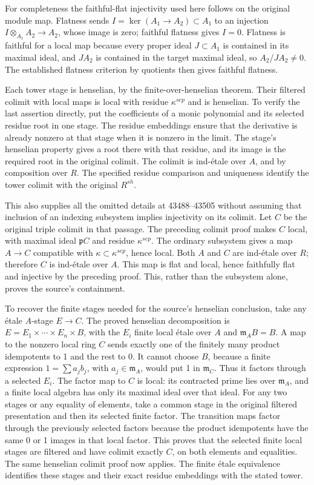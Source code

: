 For completeness the faithful-flat injectivity used here follows on the original module map. Flatness sends \(I=\ker(A_1\to A_2)\subset A_1\) to an injection \(I\otimes_{A_1}A_2\to A_2\), whose image is zero; faithful flatness gives \(I=0\). Flatness is faithful for a local map because every proper ideal \(J\subset A_1\) is contained in its maximal ideal, and \(JA_2\) is contained in the target maximal ideal, so \(A_2/JA_2\ne0\). The established flatness criterion by quotients then gives faithful flatness.

Each tower stage is henselian, by the finite-over-henselian theorem. Their filtered colimit with local maps is local with residue \(\kappa^{sep}\) and is henselian. To verify the last assertion directly, put the coefficients of a monic polynomial and its selected residue root in one stage. The residue embeddings ensure that the derivative is already nonzero at that stage when it is nonzero in the limit. The stage's henselian property gives a root there with that residue, and its image is the required root in the original colimit. The colimit is ind-étale over \(A\), and by composition over \(R\). The specified residue comparison and uniqueness identify the tower colimit with the original \(R^{sh}\).

This also supplies all the omitted details at 43488--43505 without assuming that inclusion of an indexing subsystem implies injectivity on its colimit. Let \(C\) be the original triple colimit in that passage. The preceding colimit proof makes \(C\) local, with maximal ideal \(\mathfrak pC\) and residue \(\kappa^{sep}\). The ordinary subsystem gives a map \(A\to C\) compatible with \(\kappa\subset\kappa^{sep}\), hence local. Both \(A\) and \(C\) are ind-étale over \(R\); therefore \(C\) is ind-étale over \(A\). This map is flat and local, hence faithfully flat and injective by the preceding proof. This, rather than the subsystem alone, proves the source's containment.

To recover the finite stages needed for the source's henselian conclusion, take any étale \(A\)-stage \(E\to C\). The proved henselian decomposition is \(E=E_1\times\cdots\times E_n\times B\), with the \(E_i\) finite local étale over \(A\) and \(\mathfrak m_A B=B\). A map to the nonzero local ring \(C\) sends exactly one of the finitely many product idempotents to 1 and the rest to 0. It cannot choose \(B\), because a finite expression \(1=\sum a_jb_j\), with \(a_j\in\mathfrak m_A\), would put 1 in \(\mathfrak m_C\). Thus it factors through a selected \(E_i\). The factor map to \(C\) is local: its contracted prime lies over \(\mathfrak m_A\), and a finite local algebra has only its maximal ideal over that ideal. For any two stages or any equality of elements, take a common stage in the original filtered presentation and then its selected finite factor. The transition maps factor through the previously selected factors because the product idempotents have the same 0 or 1 images in that local factor. This proves that the selected finite local stages are filtered and have colimit exactly \(C\), on both elements and equalities. The same henselian colimit proof now applies. The finite étale equivalence identifies these stages and their exact residue embeddings with the stated tower.

